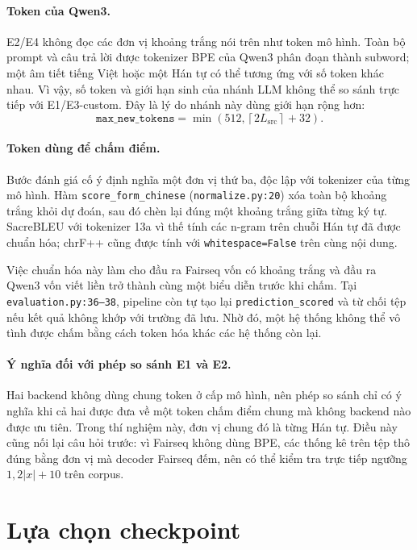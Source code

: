 \documentclass[11pt]{article}
\begin{document}
\paragraph{Token của Qwen3.}
E2/E4 không đọc các đơn vị khoảng trắng nói trên như token mô hình. Toàn bộ
prompt và câu trả lời được tokenizer BPE của Qwen3 phân đoạn thành subword;
một âm tiết tiếng Việt hoặc một Hán tự có thể tương ứng với số token khác
nhau. Vì vậy, số token và giới hạn sinh của nhánh LLM không thể so sánh trực
tiếp với E1/E3-custom. Đây là lý do nhánh này dùng giới hạn rộng hơn:
\[
  \texttt{max\_new\_tokens}
  =\min\!\left(512,\left\lceil2L_{\mathrm{src}}\right\rceil+32\right).
\]

\paragraph{Token dùng để chấm điểm.}
Bước đánh giá cố ý định nghĩa một đơn vị thứ ba, độc lập với tokenizer của
từng mô hình. Hàm \texttt{score\_form\_chinese}
(\texttt{normalize.py:20}) xóa toàn bộ khoảng trắng khỏi dự đoán, sau đó chèn
lại đúng một khoảng trắng giữa từng ký tự. SacreBLEU với tokenizer 13a vì thế
tính các n-gram trên chuỗi Hán tự đã được chuẩn hóa; chrF++ cũng được tính với
\texttt{whitespace=False} trên cùng nội dung.

Việc chuẩn hóa này làm cho đầu ra Fairseq vốn có khoảng trắng và đầu ra Qwen3
vốn viết liền trở thành cùng một biểu diễn trước khi chấm. Tại
\texttt{evaluation.py:36--38}, pipeline còn tự tạo lại
\texttt{prediction\_scored} và từ chối tệp nếu kết quả không khớp với trường
đã lưu. Nhờ đó, một hệ thống không thể vô tình được chấm bằng cách token hóa
khác các hệ thống còn lại.

\paragraph{Ý nghĩa đối với phép so sánh E1 và E2.}
Hai backend không dùng chung token ở cấp mô hình, nên phép so sánh chỉ có ý
nghĩa khi cả hai được đưa về một token chấm điểm chung mà không backend nào
được ưu tiên. Trong thí nghiệm này, đơn vị chung đó là từng Hán tự. Điều này
cũng nối lại câu hỏi trước: vì Fairseq không dùng BPE, các thống kê trên tệp
thô đúng bằng đơn vị mà decoder Fairseq đếm, nên có thể kiểm tra trực tiếp
ngưỡng $1{,}2|x|+10$ trên corpus.

\section{Lựa chọn checkpoint}
\end{document}
